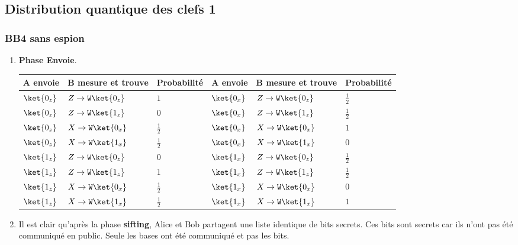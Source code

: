\subsection{Distribution quantique des clefs 1}

\subsubsection{BB4 sans espion}

\begin{enumerate}
\item \textbf{ Phase Envoie}.

{\footnotesize {
\begin{tabular}
[c]{|l|l|l||l|l|l|}\hline
\rowcolor[gray]{0.8}\textbf{A envoie} & \textbf{B mesure et trouve} &
\textbf{Probabilité} & \textbf{A envoie} & \textbf{B mesure et trouve} &
\textbf{Probabilité}\\\hline
$\ket{0_z} $ & $Z\rightarrow\mathtt{W}\ket{0_z}$ & $1$ & $\ket{0_x} $ &
$Z\rightarrow\mathtt{W}\ket{0_z} $ & $\frac{1}{2}$\\\hline
$\ket{0_z} $ & $Z\rightarrow\mathtt{W}\ket{1_z}$ & $0$ & $\ket{0_x} $ &
$Z\rightarrow\mathtt{W}\ket{1_z} $ & $\frac{1}{2}$\\\hline
$\ket{0_z} $ & $X\rightarrow\mathtt{W}\ket{0_x}$ & $\frac{1}{2}$ & $\ket{0_x} $
& $X\rightarrow\mathtt{W}\ket{0_x} $ & $1$\\\hline
$\ket{0_z} $ & $X\rightarrow\mathtt{W}\ket{1_x}$ & $\frac{1}{2}$ & $\ket{0_x} $
& $X\rightarrow\mathtt{W}\ket{1_x} $ & $0$\\\hline\hline
$\ket{1_z} $ & $Z\rightarrow\mathtt{W}\ket{0_z}$ & $0$ & $\ket{1_x} $ &
$Z\rightarrow\mathtt{W}\ket{0_z} $ & $\frac{1}{2}$\\\hline
$\ket{1_z} $ & $Z\rightarrow\mathtt{W}\ket{1_z}$ & $1$ & $\ket{1_x} $ &
$Z\rightarrow\mathtt{W}\ket{1_z} $ & $\frac{1}{2}$\\\hline
$\ket{1_z} $ & $X\rightarrow\mathtt{W}\ket{0_x}$ & $\frac{1}{2}$ & $\ket{1_x} $
& $X\rightarrow\mathtt{W}\ket{0_x} $ & $0$\\\hline
$\ket{1_z} $ & $X\rightarrow\mathtt{W}\ket{1_x}$ & $\frac{1}{2}$ & $\ket{1_x} $
& $X\rightarrow\mathtt{W}\ket{1_x} $ & $1$\\\hline
\end{tabular}
}}

\item Il est clair qu'après la phase \textbf{sifting}, Alice et Bob partagent
une liste identique de bits secrets. Ces bits sont secrets car ils n'ont pas
été communiqué en public. Seule les bases ont été communiqué et pas les bits.
\end{enumerate}


